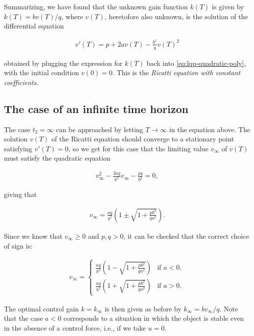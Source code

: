 \documentclass[11pt]{report}
\theoremstyle{plain}
\theoremstyle{definition}
\begin{document}
Summarizing, we have found that the unknown gain
function $k(T)$ is given by $k(T) = b v(T)/q$, where
$v(T)$, heretofore also unknown, is the solution of
the differential equation

\begin{equation*} \tag{51}\label{eq:lqp-ricatti1}
\begin{split}
v'(T) = p + 2 a v(T) - \frac{b^2}{q} v(T)^2
\end{split}
\end{equation*}

\noindent obtained by plugging the expression for $k(T)$ back
into \eqref{eq:lqp-quadratic-poly}, with the initial
condition $v(0)=0$. This is the \emph{Ricatti equation with
constant coefficients}.

\subsection{The case of an infinite time horizon}

The case $t_2=\infty$ can be approached by letting
$T\to\infty$ in the equation above. The solution
$v(T)$ of the Ricatti equation should converge to a
stationary point satisfying $v'(T)=0$, so we get for
this case that the limiting value $v_\infty$ of $v(T)$
must satisfy the quadratic equation

\begin{align*}
v_\infty^2 - \frac{2aq}{b^2} v_\infty - \frac{pq}{b^2} = 0,
\end{align*}

\noindent giving that

\begin{align*}
v_\infty = \frac{aq}{b^2}\left( 1 \pm \sqrt{1+\frac{pb^2}{qa^2}}\right).
\end{align*}

\noindent Since we know that $v_\infty\ge 0$ and $p,q>0$, it can
be checked that the correct choice of sign is:

\begin{align*}
v_\infty = \begin{cases}
\frac{aq}{b^2}\left( 1 - \sqrt{1+\frac{pb^2}{qa^2}}\right)
&
\textrm{if }a<0,  \\
\frac{aq}{b^2}\left( 1 + \sqrt{1+\frac{pb^2}{qa^2}}\right)
&
\textrm{if }a>0.
\end{cases}
\end{align*}

\noindent The optimal control gain $k=k_\infty$ is then given as
before by $k_\infty = b v_\infty/q$. Note that the
case $a<0$ corresponds to a situation in which the
object is stable even in the absence of a control
force, i.e., if we take $u=0$.
\end{document}
